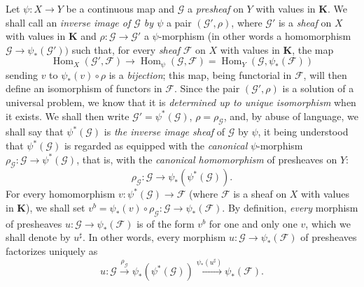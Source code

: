 \begin{env}[3.5.3]
\label{0.3.5.3}
Let $\psi:X\to Y$ be a continuous map and $\mathcal{G}$ a
\emph{presheaf} on $Y$ with values in $\mathbf{K}$. We shall call an
\emph{inverse image of $\mathcal{G}$ by $\psi$} a pair
$(\mathcal{G}',\rho)$, where $\mathcal{G}'$ is a \emph{sheaf} on $X$ with
values in $\mathbf{K}$ and
$\rho:\mathcal{G}\to\mathcal{G}'$ a $\psi$-morphism (in other words a
homomorphism $\mathcal{G}\to\psi_*(\mathcal{G}'))$ such that, for every
\emph{sheaf} $\mathcal{F}$ on $X$ with values in $\mathbf{K}$,
the map
\begin{equation*}
  \operatorname{Hom}_X(\mathcal{G}',\mathcal{F})
  \longrightarrow \operatorname{Hom}_\psi(\mathcal{G},\mathcal{F})
  =\operatorname{Hom}_Y(\mathcal{G},\psi_*(\mathcal{F}))
\tag{3.5.3.1}\label{0.3.5.3.1}
\end{equation*}
sending $v$ to $\psi_*(v)\circ\rho$ is a \emph{bijection}; this
map, being functorial in $\mathcal{F}$, will then define an
isomorphism of functors in $\mathcal{F}$. Since the pair
$(\mathcal{G}',\rho)$ is a solution of a universal problem, we know that it
is \emph{determined up to unique isomorphism} when it exists. We shall
then write $\mathcal{G}'=\psi^*(\mathcal{G})$, $\rho=\rho_{\mathcal{G}}$, and, by
abuse of language, we shall say that $\psi^*(\mathcal{G})$ is \emph{the inverse
image sheaf} of $\mathcal{G}$ by $\psi$, it being understood that
$\psi^*(\mathcal{G})$ is regarded as equipped with the \emph{canonical}
$\psi$-morphism
$\rho_{\mathcal{G}}:\mathcal{G}\to\psi^*(\mathcal{G})$, that is, with
the \emph{canonical homomorphism} of presheaves on $Y$:
\begin{equation*}
  \rho_{\mathcal{G}}:\mathcal{G}\to\psi_*(\psi^*(\mathcal{G})).
\tag{3.5.3.2}\label{0.3.5.3.2}
\end{equation*}
For every homomorphism
$v:\psi^*(\mathcal{G})\to\mathcal{F}$ (where $\mathcal{F}$ is a sheaf on
$X$ with values in $\mathbf{K}$), we shall set
$v^b=\psi_*(v)\circ\rho_{\mathcal{G}}:
\mathcal{G}\to\psi_*(\mathcal{F})$. By definition, \emph{every} morphism of
presheaves $u:\mathcal{G}\to\psi_*(\mathcal{F})$ is of the form $v^b$ for
one and only one $v$, which we shall denote by $u^\sharp$. In other words, every
morphism $u:\mathcal{G}\to\psi_*(\mathcal{F})$ of presheaves factorizes
uniquely as
\begin{equation*}
  u:\mathcal{G}\xrightarrow{\rho_{\mathcal{G}}}
  \psi_*(\psi^*(\mathcal{G}))
  \xrightarrow{\psi_*(u^\sharp)}\psi_*(\mathcal{F}).
\tag{3.5.3.3}\label{0.3.5.3.3}
\end{equation*}
\end{env}


